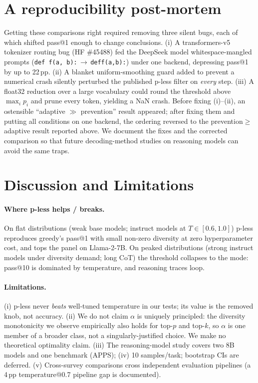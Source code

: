 \documentclass[11pt]{article}                       %
\begin{document}
\section{A reproducibility post-mortem}\label{sec:repro}
Getting these comparisons right required removing three silent bugs, each of which shifted pass@1
enough to change conclusions. (i) A transformers-v5 tokenizer routing bug (HF \#45488) fed the
DeepSeek model whitespace-mangled prompts (\texttt{def f(a, b):}\,$\to$\,\texttt{deff(a,b):}) under one
backend, depressing pass@1 by up to 22\,pp. (ii) A blanket uniform-smoothing guard added to prevent a
numerical crash silently perturbed the published p-less filter on \emph{every} step. (iii) A
float32 reduction over a large vocabulary could round the threshold above $\max_i p_i$ and prune every
token, yielding a NaN crash. Before fixing (i)--(ii), an ostensible ``adaptive $\gg$ prevention''
result appeared; after fixing them and putting all conditions on one backend, the ordering reversed to
the prevention$\ge$adaptive result reported above. We document the fixes and the corrected comparison
so that future decoding-method studies on reasoning models can avoid the same traps.

\section{Discussion and Limitations}\label{sec:discussion}
\paragraph{Where p-less helps / breaks.} On flat distributions (weak base models; instruct models at
$T\!\in\![0.6,1.0]$) p-less reproduces greedy's pass@1 with small non-zero diversity at zero
hyperparameter cost, and tops the \citet{shi2024decoding} panel on Llama-2-7B. On peaked distributions
(strong instruct models under diversity demand; long CoT) the threshold collapses to the mode:
pass@10 is dominated by temperature, and reasoning traces loop.

\paragraph{Limitations.} (i) p-less never \emph{beats} well-tuned temperature in our tests; its value
is the removed knob, not accuracy. (ii) We do not claim $\alpha$ is uniquely principled: the diversity
monotonicity we observe empirically also holds for top-$p$ and top-$k$, so $\alpha$ is one member of a
broader class, not a singularly-justified choice. We make no theoretical optimality claim. (iii) The
reasoning-model study covers two 8B models and one benchmark (APPS); (iv) 10 samples/task; bootstrap
CIs are deferred. (v) Cross-survey comparisons cross independent evaluation pipelines (a 4\,pp
temperature@0.7 pipeline gap is documented).
\end{document}
